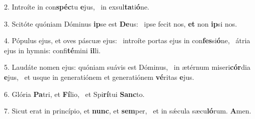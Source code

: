 2. Introíte in con\textbf{spéc}tu \textbf{e}jus, \ast\  in exsul\textbf{ta}ti\textbf{ó}ne.\

3. Scitóte quóniam Dóminus \textbf{ip}se est \textbf{De}us: \ast\  ipse fecit nos, \textbf{et} non \textbf{ip}si nos.\

4. Pópulus ejus, et oves páscuæ ejus: \dag\  introíte portas ejus in con\textbf{fes}si\textbf{ó}ne, \ast\  átria ejus in hymnis: confi\textbf{té}mini \textbf{il}li.\

5. Laudáte nomen ejus: quóniam suávis est Dóminus, \dag\  in ætérnum miseri\textbf{cór}dia \textbf{e}jus, \ast\  et usque in generatiónem et generatiónem \textbf{vé}ritas \textbf{e}jus.\

6. Glória \textbf{Pa}tri, et \textbf{Fí}lio, \ast\  et Spi\textbf{rí}tui \textbf{Sanc}to.\

7. Sicut erat in princípio, et \textbf{nunc}, et \textbf{sem}per, \ast\  et in sǽcula sæcu\textbf{ló}rum. \textbf{A}men.\

